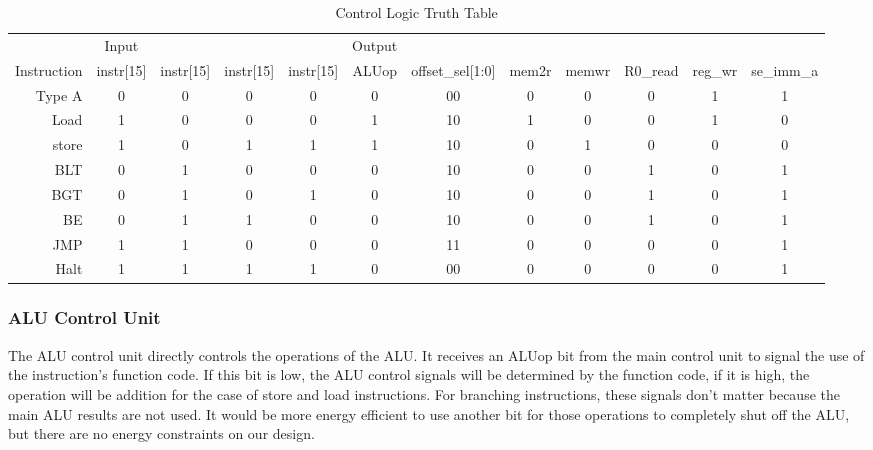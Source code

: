     \begin{table}[htbp]
        \caption{Control Logic Truth Table}
        \label{control}
        \centering
        \begin{tabular}{r | c c c c | c c c c c c c}
                  & Input            &           &           &           & Output &                 &       &       &         &        & \\
            Instruction & instr[15] & instr[15] & instr[15] & instr[15] & ALUop  & offset\_sel[1:0] & mem2r & memwr & R0\_read & reg\_wr & se\_imm\_a \\
            \hline
            Type A      & 0                & 0         & 0         & 0         & 0      & 00              & 0     & 0     & 0       & 1      & 1 \\
            Load        & 1                & 0         & 0         & 0         & 1      & 10              & 1     & 0     & 0       & 1      & 0 \\
            store       & 1                & 0         & 1         & 1         & 1      & 10              & 0     & 1     & 0       & 0      & 0 \\
            BLT         & 0                & 1         & 0         & 0         & 0      & 10              & 0     & 0     & 1       & 0      & 1 \\
            BGT         & 0                & 1         & 0         & 1         & 0      & 10              & 0     & 0     & 1       & 0      & 1 \\
            BE          & 0                & 1         & 1         & 0         & 0      & 10              & 0     & 0     & 1       & 0      & 1 \\
            JMP         & 1                & 1         & 0         & 0         & 0      & 11              & 0     & 0     & 0       & 0      & 1 \\
            Halt        & 1                & 1         & 1         & 1         & 0      & 00              & 0     & 0     & 0       & 0      & 1 \\
        \end{tabular}
    \end{table}


	\subsubsection{ALU Control Unit}
	The ALU control unit directly controls the operations of the ALU. It receives an ALUop bit from the main control unit to signal the use of the instruction's function code. If this bit is low, the ALU control signals will be determined by the function code, if it is high, the operation will be addition for the case of store and load instructions.
	For branching instructions, these signals don't matter because the main ALU results are not used. It would be more energy efficient to use another bit for those operations to completely shut off the ALU, but there are no energy constraints on our design. 
	
